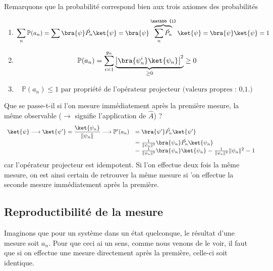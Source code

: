  Remarquons que la probabilité correspond bien aux trois axiomes des probabilités
 \begin{enumerate}
  \item \begin{equation}
 \sum_n \mathbb{P}(a_n) = \sum\bra{\psi}\hat{P_n}\ket{\psi} = \bra{\psi}\overbrace{
 \sum_n \hat{P_n}}^{\mathbb{1}}\ket{\psi} = \bra{\psi}\ket{\psi} = 1
 \end{equation}
 \item\begin{equation}
 \mathbb{P}(a_n) = \sum_{i=1}^{g_n} \underbrace{\left|\bra{\psi_n^i}\ket{\psi_n}
 \right|^2}_{\geq 0} \geq 0
 \end{equation}
 \item  
 \begin{equation}
 \mathbb{P}(a_n) \leq 1 \text{ par propriété de l'opérateur projecteur (valeurs propres : 0,1.)}
 \end{equation}
 \end{enumerate}
 Que se passe-t-il si l'on mesure immédiatement après la première mesure, la 
 même observable ($\longrightarrow$ signifie l'application de $\hat{A}$) ?
 \begin{equation}
 \begin{array}{ll}
 \ket{\psi} \longrightarrow \ket{\psi'} = \dfrac{\ket{\psi_n}}{\|\psi_n\|} \longrightarrow
 \mathbb{P}'(a_n) &= \bra{\psi'}\hat{P_n}\ket{\psi'}\\
 &= \frac{1}{\|\psi_n\|^2}\bra{\psi_n}\hat{P_n}\ket{\psi_n}\\
 &= \frac{1}{\|\psi_n\|^2}\bra{\psi_n}\ket{\psi_n} = \frac{1}{\|\psi_n\|^2}\|\psi_n\|^2=1
\end{array}
 \end{equation}
 car l'opérateur projecteur est idempotent. Si l'on effectue deux fois la même mesure, on 
 est ainsi certain de retrouver la même mesure si 'on effectue la seconde mesure immédiatement 
 après la première.
 
 \subsection{Reproductibilité de la mesure}
 Imaginons que pour un système dans un état quelconque, le résultat d'une mesure soit $a_n$. 
 Pour que ceci ai un sens, comme nous venons de le voir, il faut que si on effectue une 
 mesure directement après la première, celle-ci soit identique.\\
 

